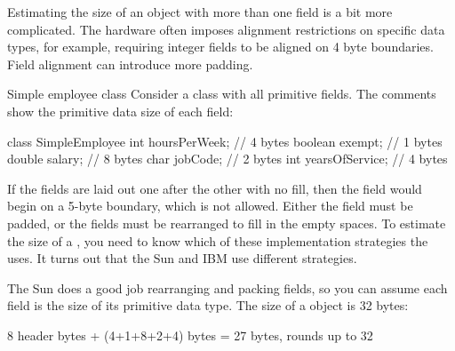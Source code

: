 Estimating the size of an object with more than one field is a bit more complicated. The hardware often imposes alignment restrictions on specific data types, for example, requiring integer fields to be aligned on 4 byte boundaries. Field alignment can introduce more padding.
 
\begin{example}{Simple employee class}
Consider a  class with all primitive fields. The comments
show the primitive data size of each field:
\begin{verbatim2}
class SimpleEmployee {
    int hoursPerWeek;        // 4 bytes 
    boolean exempt;          // 1 bytes
    double salary;           // 8 bytes
    char jobCode;            // 2 bytes
    int yearsOfService;      // 4 bytes	
}
\end{verbatim2}
If the fields are laid out one after the other with no fill, then the
 field  would begin on a 5-byte boundary, which is
not allowed. Either the  field must be padded, or the fields must
be rearranged to fill in the empty spaces. To estimate the size of a
, you need to know which of these implementation
strategies the \jre uses. It turns out that the Sun and IBM use different
strategies.
\end{example}
The Sun \jre does a good job rearranging and packing fields, so you can assume
each field is the size of its primitive data type. The size of a
 object is 32 bytes:
\begin{verbatim2}               
8 header bytes + (4+1+8+2+4) bytes = 27 bytes, rounds up to 32
\end{verbatim2} 

